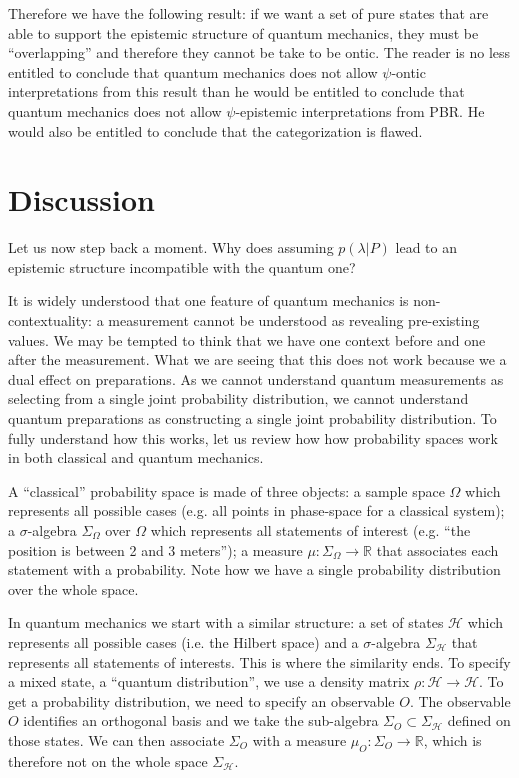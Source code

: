 \documentclass[twocolumn,prl,floatfix,superscriptaddress]{revtex4-2}
\begin{document}
Therefore we have the following result: if we want a set of pure states that are able to support the epistemic structure of quantum mechanics, they must be ``overlapping'' and therefore they cannot be take to be ontic. The reader is no less entitled to conclude that quantum mechanics does not allow $\psi$-ontic interpretations from this result than he would be entitled to conclude that quantum mechanics does not allow $\psi$-epistemic interpretations from PBR. He would also be entitled to conclude that the categorization is flawed.



\section{Discussion}

Let us now step back a moment. Why does assuming $p(\lambda|P)$ lead to an epistemic structure incompatible with the quantum one?

It is widely understood that one feature of quantum mechanics is non-contextuality: a measurement cannot be understood as revealing pre-existing values. We may be tempted to think that we have one context before and one after the measurement. What we are seeing that this does not work because we a dual effect on preparations. As we cannot understand quantum measurements as selecting from a single joint probability distribution, we cannot understand quantum preparations as constructing a single joint probability distribution. To fully understand how this works, let us review how how probability spaces work in both classical and quantum mechanics.

A ``classical'' probability space is made of three objects: a sample space $\Omega$ which represents all possible cases (e.g. all points in phase-space for a classical system); a $\sigma$-algebra $\Sigma_\Omega$ over $\Omega$ which represents all statements of interest (e.g. ``the position is between 2 and 3 meters''); a measure $\mu : \Sigma_\Omega \to \mathbb{R}$ that associates each statement with a probability. Note how we have a single probability distribution over the whole space.

In quantum mechanics we start with a similar structure: a set of states $\mathcal{H}$ which represents all possible cases (i.e. the Hilbert space) and a $\sigma$-algebra $\Sigma_{\mathcal{H}}$ that represents all statements of interests. This is where the similarity ends. To specify a mixed state, a ``quantum distribution'', we use a density matrix $\rho : \mathcal{H} \to \mathcal{H}$. To get a probability distribution, we need to specify an observable $O$. The observable $O$ identifies an orthogonal basis and we take the sub-algebra $\Sigma_O \subset \Sigma_{\mathcal{H}}$ defined on those states. We can then associate $\Sigma_O$ with a measure $\mu_O : \Sigma_O \to \mathbb{R}$, which is therefore not on the whole space $\Sigma_{\mathcal{H}}$.
\end{document}
